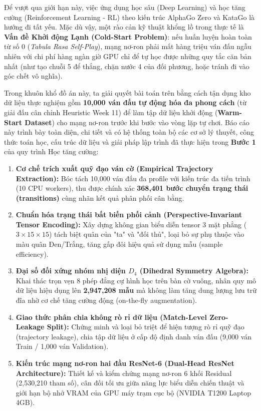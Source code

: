 \documentclass[11pt,a4paper]{report}
\begin{document}
Để vượt qua giới hạn này, việc ứng dụng học sâu (Deep Learning) và học tăng cường (Reinforcement Learning - RL) theo kiến trúc AlphaGo Zero và KataGo là hướng đi tất yếu. Mặc dù vậy, một rào cản kỹ thuật khổng lồ trong thực tế là \textbf{Vấn đề Khởi động Lạnh (Cold-Start Problem)}: nếu huấn luyện hoàn toàn từ số 0 (\textit{Tabula Rasa Self-Play}), mạng nơ-ron phải mất hàng triệu ván đấu ngẫu nhiên với chi phí hàng ngàn giờ GPU chỉ để tự học được những quy tắc căn bản nhất (như tạo chuỗi 5 để thắng, chặn nước 4 của đối phương, hoặc tránh đi vào góc chết vô nghĩa). 

Trong khuôn khổ đồ án này, ta giải quyết bài toán trên bằng cách tận dụng kho dữ liệu thực nghiệm gồm \textbf{10,000 ván đấu tự động hóa đa phong cách} (từ giải đấu cân chỉnh Heuristic Week 11) để làm tập dữ liệu khởi động (\textbf{Warm-Start Dataset}) cho mạng nơ-ron trước khi bước vào vòng lặp tự chơi. Báo cáo này trình bày toàn diện, chi tiết và có hệ thống toàn bộ các cơ sở lý thuyết, công thức toán học, cấu trúc dữ liệu và giải pháp lập trình đã thực hiện trong \textbf{Bước 1} của quy trình Học tăng cường:
\begin{enumerate}
    \item \textbf{Cơ chế trích xuất quỹ đạo ván cờ (Empirical Trajectory Extraction):} Bóc tách 10,000 ván đấu đa profile với kiến trúc đa tiến trình (10 CPU workers), thu được chính xác \textbf{368,401 bước chuyển trạng thái (transitions)} cùng nhãn kết quả phân phối cân bằng.
    \item \textbf{Chuẩn hóa trạng thái bất biến phối cảnh (Perspective-Invariant Tensor Encoding):} Xây dựng không gian biểu diễn tensor 3 mặt phẳng ($3 \times 15 \times 15$) tách biệt quân của "ta" và "đối thủ", loại bỏ sự phụ thuộc vào màu quân Đen/Trắng, tăng gấp đôi hiệu quả sử dụng mẫu (sample efficiency).
    \item \textbf{Đại số đối xứng nhóm nhị diện $D_4$ (Dihedral Symmetry Algebra):} Khai thác trọn vẹn 8 phép đẳng cự hình học trên bàn cờ vuông, nhân quy mô dữ liệu hiệu dụng lên \textbf{2,947,208 mẫu} mà không làm tăng dung lượng lưu trữ đĩa nhờ cơ chế tăng cường động (on-the-fly augmentation).
    \item \textbf{Giao thức phân chia không rò rỉ dữ liệu (Match-Level Zero-Leakage Split):} Chứng minh và loại bỏ triệt để hiện tượng rò rỉ quỹ đạo (trajectory leakage), chia tập dữ liệu ở cấp độ định danh ván đấu (9,000 ván Train / 1,000 ván Validation).
    \item \textbf{Kiến trúc mạng nơ-ron hai đầu ResNet-6 (Dual-Head ResNet Architecture):} Thiết kế và kiểm chứng mạng nơ-ron 6 khối Residual (2,530,210 tham số), cân đối tối ưu giữa năng lực biểu diễn chiến thuật và giới hạn bộ nhớ VRAM của GPU máy trạm cục bộ (NVIDIA T1200 Laptop 4GB).
\end{enumerate}
\end{document}
